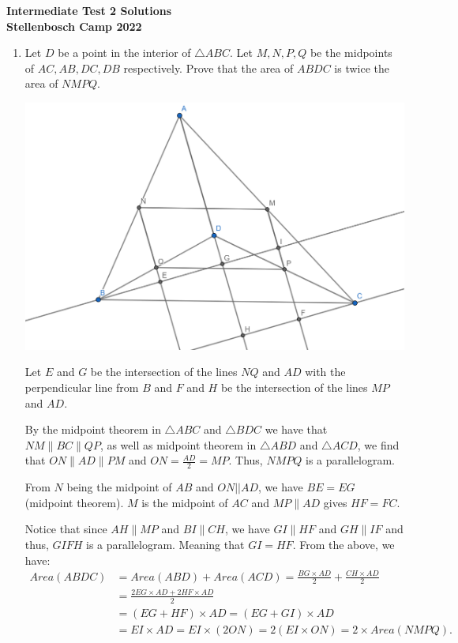 \documentclass{article}
\begin{document}
\thispagestyle{empty}

\begin{center}
  \textbf{\Large Intermediate Test 2 Solutions}
  \\ \vspace{1em}
  \textbf{\large Stellenbosch Camp 2022}
\end{center}


\bigskip

\begin{enumerate}[itemsep=12pt plus 6pt minus 6pt]

\item %
Let $D$ be a point in the interior of $\triangle ABC$. Let $M,N,P,Q$ be the midpoints of $AC, AB, DC, DB$ respectively. Prove that the area of $ABDC$ is twice the area of $NMPQ$.

\begin{center}
  \includegraphics[scale=0.6]{IntermediateQ1_Day2Graphic.png}
\end{center}
Let $E$ and $G$ be the intersection of the lines $NQ$ and $AD$ with the perpendicular line from $B$ and $F$ and $H$ be the intersection of the lines $MP$ and $AD$.

By the midpoint theorem in $\triangle ABC$ and $\triangle BDC$ we have that $NM \parallel BC \parallel QP$, as well as midpoint theorem in $\triangle ABD$ and $\triangle ACD$, we find that $ON \parallel AD \parallel PM$ and $ON = \frac{AD}{2} =MP$. Thus, $NMPQ$ is a parallelogram. 

From $N$ being the midpoint of $AB$ and $ON||AD$, we have $BE = EG$ (midpoint theorem).
$M$ is the midpoint of $AC$ and $MP \parallel AD$ gives $HF = FC$.

Notice that since $AH \parallel MP$ and $BI \parallel CH$, we have $GI \parallel HF$ and $GH \parallel IF$ and thus, $GIFH$ is a parallelogram. Meaning that $GI = HF$.
From the above, we have:
\begin{align*}
Area(ABDC)
  & = Area(ABD) + Area(ACD) = \frac{BG \times AD}{2} + \frac{CH \times AD}{2} \\
  & = \frac{2EG \times AD + 2HF \times AD}{2}\\
  & = (EG + HF) \times AD = (EG + GI) \times AD\\
  & = EI \times AD = EI \times (2ON) = 2(EI \times ON) = 2 \times Area(NMPQ).
\end{align*}



\end{enumerate}
\end{document}
